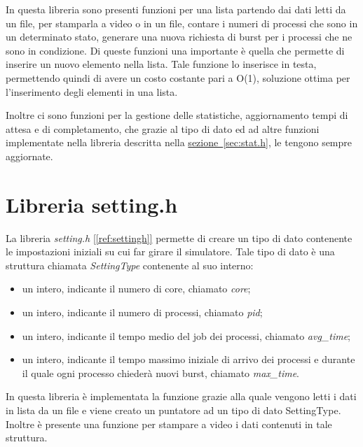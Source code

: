 \documentclass[Lau, oneside]{sapthesis}%
\begin{document}
In questa libreria sono presenti funzioni per una lista partendo dai dati letti da un file, per stamparla a video o in un file, contare i numeri di processi che sono in un determinato stato, generare una nuova richiesta di burst per i processi che ne sono in condizione.
Di queste funzioni una importante è quella che permette di inserire un nuovo elemento nella lista.
Tale funzione lo inserisce in testa, permettendo quindi di avere un costo costante pari a O(1), soluzione ottima per l'inserimento degli elementi in una lista.

Inoltre ci sono funzioni per la gestione delle statistiche, aggiornamento tempi di attesa e di completamento, che grazie al tipo di dato ed ad altre funzioni implementate nella libreria descritta nella \hyperref[sec:stat.h]{sezione~\ref*{sec:stat.h}}, le tengono sempre aggiornate.

\section{Libreria setting.h}
\label{sec:setting.h}
La libreria \textit{setting.h} \hyperref[ref:settingh]{[\ref*{ref:settingh}]} permette di creare un tipo di dato contenente le impostazioni iniziali su cui far girare il simulatore.
Tale tipo di dato è una struttura chiamata \textit{SettingType} contenente al suo interno:
\begin{itemize}
    \item un intero, indicante il numero di core, chiamato \textit{core};
    \item un intero, indicante il numero di processi, chiamato \textit{pid};
    \item un intero, indicante il tempo medio del job dei processi, chiamato \textit{avg\_time};
    \item un intero, indicante il tempo massimo iniziale di arrivo dei processi e durante il quale ogni processo chiederà nuovi burst, chiamato \textit{max\_time}.
\end{itemize}

In questa libreria è implementata la funzione grazie alla quale vengono letti i dati in lista da un file e viene creato un puntatore ad un tipo di dato SettingType.
Inoltre è presente una funzione per stampare a video i dati contenuti in tale struttura.
\end{document}
